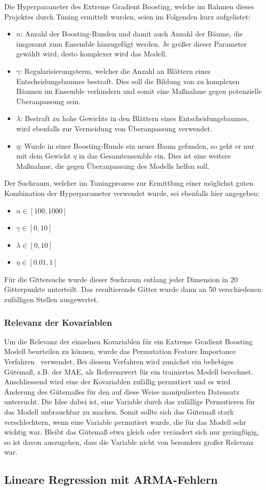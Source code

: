 Die Hyperparameter des Extreme Gradient Boosting, welche im Rahmen dieses Projektes durch Tuning
ermittelt wurden, seien im Folgenden kurz aufgelistet:
\begin{itemize}
    \item $n$: Anzahl der Boosting-Runden und damit auch Anzahl der B\"aume, die insgesamt zum Ensemble hinzugef\"ugt werden.
        Je gr\"o{\ss}er dieser Parameter gew\"ahlt wird, desto komplexer wird das Modell.
    \item $\gamma$: Regularisierungsterm, welcher die Anzahl an Bl\"attern eines Entscheidungsbaumes bestraft.
        Dies soll die Bildung von zu komplexen B\"aumen im Ensemble verhindern und somit eine Ma{\ss}nahme gegen potenzielle
        \"Uberanpassung sein.
    \item $\lambda$: Bestraft zu hohe Gewichte in den Bl\"attern eines Entscheidungsbaumes, wird ebenfalls zur Vermeidung von
        \"Uberanpassung verwendet.
    \item $\eta$: Wurde in einer Boosting-Runde ein neuer Baum gefunden, so geht er nur mit dem Gewicht $\eta$ in das 
        Gesamtensemble ein. Dies ist eine weitere Ma{\ss}nahme, die gegen \"Uberanpassung des Modells helfen soll.
\end{itemize}
Der Suchraum, welcher im Tuningprozess zur Ermittlung einer m\"oglichst guten Kombination der Hyperparameter verwendet wurde, 
sei ebenfalls hier angegeben:
\begin{itemize}
    \item $n \in \left[100, 1000 \right]$
    \item $\gamma \in \left[0, 10 \right]$
    \item $\lambda \in \left[0, 10 \right]$
    \item $\eta \in \left[0.01, 1 \right]$
\end{itemize}
F\"ur die Gittersuche wurde dieser Suchraum entlang jeder Dimension in 20 Gitterpunkte unterteilt. Das resultierende Gitter wurde
dann an 50 verschiedenen zuf\"alligen Stellen ausgewertet.

\subsubsection{Relevanz der Kovariablen}

Um die Relevanz der einzelnen Kovariablen f\"ur ein Extreme Gradient Boosting Modell beurteilen zu k\"onnen, wurde
das Permutation Feature Importance Verfahren~\cite{molnar2019} verwendet.
Bei diesem Verfahren wird zun\"achst ein beliebiges G\"utema{\ss}, z.B. der MAE, als Referenzwert f\"ur ein trainiertes Modell
berechnet. Anschliessend wird eine der Kovariablen zuf\"allig permutiert und es wird \"Anderung des G\"utema{\ss}es f\"ur den auf
diese Weise manipulierten Datensatz untersucht.
Die Idee dabei ist, eine Variable durch das zuf\"allige Permutieren f\"ur das Modell unbrauchbar zu machen.
Somit sollte sich das G\"utema{\ss} stark verschlechtern, wenn eine Variable permutiert wurde, die f\"ur das Modell sehr wichtig war.
Bleibt das G\"utema{\ss} etwa gleich oder ver\"andert sich nur geringf\"ugig, so ist davon auszugehen, dass die Variable nicht von
besonders gro{\ss}er Relevanz war.

\subsection{Lineare Regression mit ARMA-Fehlern}
\label{sec:arma}
